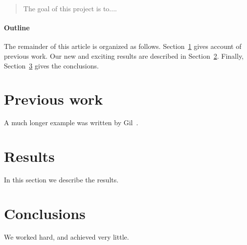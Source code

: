\documentclass[12pt]{article}
\begin{document}
\maketitle

\begin{abstract}
The goal of this project is to....
\end{abstract}



\paragraph{Outline}
The remainder of this article is organized as follows.
Section~\ref{previous work} gives account of previous work.
Our new and exciting results are described in Section~\ref{results}.
Finally, Section~\ref{conclusions} gives the conclusions.

\section{Previous work}\label{previous work}
A much longer \LaTeXe{} example was written by Gil~\cite{Gil:02}.

\section{Results}\label{results}
In this section we describe the results.

\section{Conclusions}\label{conclusions}
We worked hard, and achieved very little.
\end{document}
